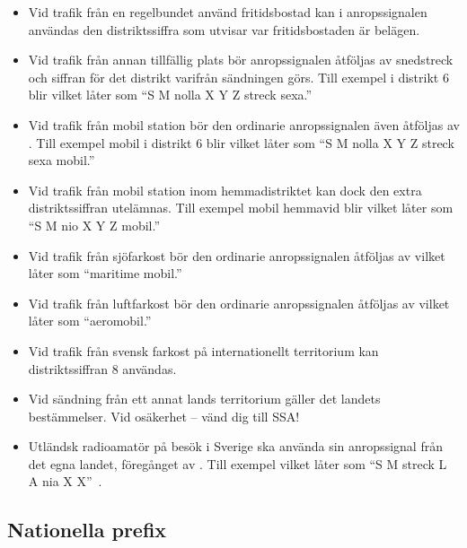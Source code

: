 \begin{itemize}
\item Vid trafik från en regelbundet använd fritidsbostad kan i
  anropssignalen användas den distriktssiffra som utvisar var
  fritidsbostaden är belägen.

\item Vid trafik från annan tillfällig plats bör anropssignalen
  åtföljas av snedstreck och siffran för det distrikt varifrån
  sändningen görs. Till exempel  i distrikt 6 blir 
   vilket låter som ``S M nolla X Y Z streck sexa.''

\item Vid trafik från mobil station bör den ordinarie anropssignalen
  även åtföljas av . Till exempel  mobil i 
  distrikt 6 blir  vilket låter som ``S M nolla X Y Z 
  streck sexa mobil.''

\item Vid trafik från mobil station inom hemmadistriktet kan dock den extra
  distriktssiffran utelämnas.  Till exempel  mobil hemmavid 
  blir  vilket låter som ``S M nio X Y Z mobil.''

\item Vid trafik från sjöfarkost bör den ordinarie anropssignalen
  åtföljas av  vilket låter som ``maritime mobil.''

\item Vid trafik från luftfarkost bör den ordinarie anropssignalen
  åtföljas av  vilket låter som ``aeromobil.''

\item Vid trafik från svensk farkost på internationellt territorium
 kan distriktssiffran 8 användas.

\item Vid sändning från ett annat lands territorium gäller det landets
  bestämmelser.
  Vid osäkerhet -- vänd dig till SSA!

\item Utländsk radioamatör på besök i Sverige ska använda sin
  anropssignal från det egna landet, föregånget av . Till 
  exempel  vilket låter som ``S M streck L A nia X X''~\cite{TR6101}.
\end{itemize}

\subsection{Nationella prefix}

